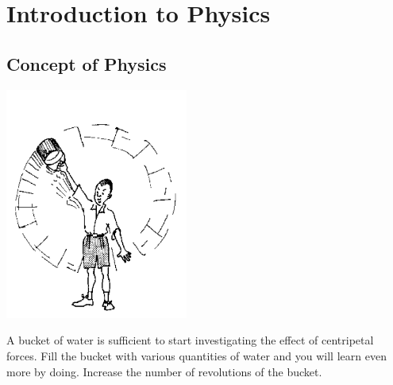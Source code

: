 \section{Introduction to Physics} 

\begin{multicols}{2}


\section*{Concept of Physics} 



\begin{center}
\includegraphics[width=0.45\textwidth]{./img/source/bucket-swing-2.png}
\end{center}


A bucket of water is sufficient to start investigating the effect of centripetal forces. Fill the
bucket with various quantities of water and you will learn even more by doing. Increase the
number of revolutions of the bucket.\\


\end{multicols}
